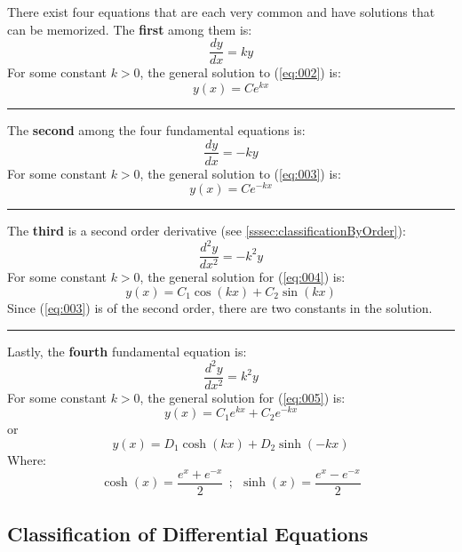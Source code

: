 \documentclass[12pt]{article}
\begin{document}
There exist four equations that are each very common and have solutions that can be memorized. The \textbf{first} among them is:
\begin{equation}
  \frac{dy}{dx} = ky
  \label{eq:002}
\end{equation}
For some constant $k>0$, the general solution to (\ref{eq:002}) is:
\begin{equation*}
  y(x) = Ce^{kx}
\end{equation*}
\hrule
The \textbf{second} among the four fundamental equations is:
\begin{equation}
  \frac{dy}{dx} = -ky
  \label{eq:003}
\end{equation}
For some constant $k>0$, the general solution to (\ref{eq:003}) is:
\begin{equation*}
  y(x) = Ce^{-kx}
\end{equation*}
\hrule
The \textbf{third} is a second order derivative (see \ref{sssec:classificationByOrder}):
\begin{equation}
  \frac{d^2y}{dx^2} = -k^2y
  \label{eq:004}
\end{equation}
For some constant $k>0$, the general solution for (\ref{eq:004}) is:
\begin{equation*}
  y(x) = C_1\cos(kx) + C_2\sin(kx)
\end{equation*}
Since (\ref{eq:003}) is of the second order, there are two constants in the solution.
\vspace{08pt}
\hrule
Lastly, the \textbf{fourth} fundamental equation is:
\begin{equation}
  \frac{d^2y}{dx^2} = k^2y
  \label{eq:005}
\end{equation}
For some constant $k>0$, the general solution for (\ref{eq:005}) is:
\begin{equation*}
  y(x) = C_1e^{kx} + C_2e^{-kx}
\end{equation*}
or
\begin{equation*}
  y(x) = D_1\cosh(kx) + D_2\sinh(-kx)
\end{equation*}
Where:
\begin{equation*}
  \cosh(x) = \frac{e^x+e^{-x}}{2}\ \ ;\ \ \sinh(x) = \frac{e^x-e^{-x}}{2}
\end{equation*}


\subsection{Classification of Differential Equations}
\label{ssec:classificationOfDifferentialEquations}
\end{document}
